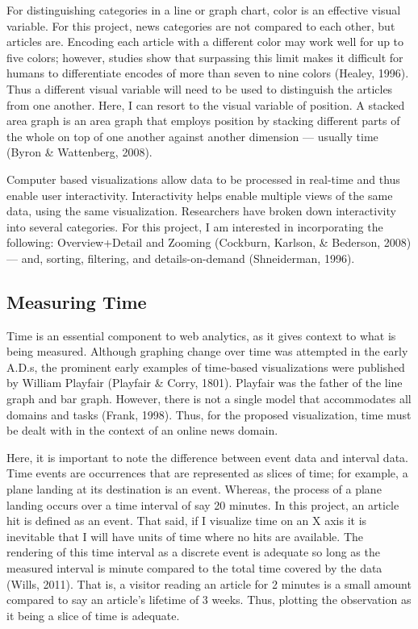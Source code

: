 \documentclass[12pt]{article}
\begin{document}
For distinguishing categories in a line or graph chart, color is an effective visual variable. For this project, news categories are not compared to each other, but articles are. Encoding each article with a different color may work well for up to five colors; however, studies show that surpassing this limit makes it difficult for humans to differentiate encodes of more than seven to nine colors (Healey, 1996). Thus a different visual variable will need to be used to distinguish the articles from one another. Here, I can resort to the visual variable of position. A stacked area graph is an area graph that employs position by stacking different parts of the whole on top of one another against another dimension --- usually time (Byron \& Wattenberg, 2008).  

Computer based visualizations allow data to be processed in real-time and thus enable user interactivity. Interactivity helps enable multiple views of the same data, using the same visualization. Researchers have broken down interactivity into several categories. For this project, I am interested in incorporating the following: Overview+Detail and Zooming (Cockburn, Karlson, \& Bederson, 2008) --- and, sorting, filtering, and details-on-demand (Shneiderman, 1996). 


\subsection{Measuring Time}
Time is an essential component to web analytics, as it gives context to what is being measured. Although graphing change over time was attempted in the early A.D.s, the prominent early examples of time-based visualizations were published by William Playfair (Playfair \& Corry, 1801). Playfair was the father of the line graph and bar graph. However, there is not a single model that accommodates all domains and tasks (Frank, 1998). Thus, for the proposed visualization, time must be dealt with in the context of an online news domain.   

Here, it is important to note the difference between event data and interval data. Time events are occurrences that are represented as slices of time; for example, a plane landing at its destination is an event. Whereas, the process of a plane landing occurs over a time interval of say 20 minutes. In this project, an article hit is defined as an event. That said, if I visualize time on an X axis it is inevitable that I will have units of time where no hits are available. The rendering of this time interval as a discrete event is adequate so long as the measured interval is minute compared to the total time covered by the data (Wills, 2011). That is, a visitor reading an article for 2 minutes is a small amount compared to say an article's lifetime of 3 weeks. Thus, plotting the observation as it being a slice of time is adequate.  
\end{document}
